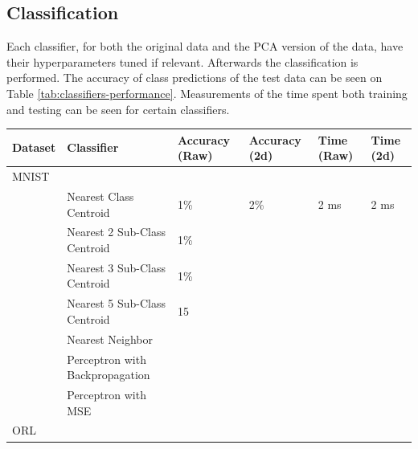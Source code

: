 \subsection{Classification}
Each classifier, for both the original data and the PCA version of the data, have their hyperparameters tuned if relevant. Afterwards the classification is performed.  
The accuracy of class predictions of the test data can be seen on Table \ref{tab:classifiers-performance}. Measurements of the time spent both training and testing can be seen for certain classifiers. 


\begin{table}[htbp]
    \centering
    \begin{tabular}{|l|l|l|l|l|l|} 
    \hline
    Dataset & Classifier                       & Accuracy (Raw)       & Accuracy (2d)        & Time (Raw)           & Time (2d)  \\ 
    \hline
    MNIST   & \multicolumn{1}{l}{}            & \multicolumn{1}{l}{} & \multicolumn{1}{l}{} & \multicolumn{1}{l}{} &            \\ 
    \hline
            & Nearest Class Centroid          & 1\%                  & 2\%                  & 2 ms                 & 2 ms       \\ 
    \cline{2-6}
            & Nearest 2 Sub-Class Centroid    & 1\%                  &                      &                      &            \\ 
    \cline{2-6}
            & Nearest 3 Sub-Class Centroid    & 1\%                  &                      &                      &            \\ 
    \cline{2-6}
            & Nearest 5 Sub-Class Centroid    & 15                   &                      &                      &            \\ 
    \cline{2-6}
            & Nearest Neighbor                &                      &                      &                      &            \\ 
    \cline{2-6}
            & Perceptron with Backpropagation &                      &                      &                      &            \\ 
    \cline{2-6}
            & Perceptron with MSE             &                      &                      &                      &            \\ 
    \hline
    ORL     & \multicolumn{1}{l}{}            & \multicolumn{1}{l}{} & \multicolumn{1}{l}{} & \multicolumn{1}{l}{} &            \\ 

\end{tabular}
\end{table}
